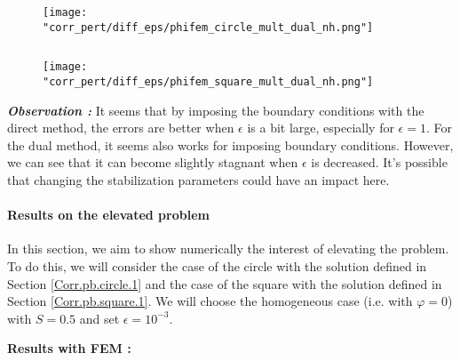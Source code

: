 \begin{enumerate}[label=\textbullet]
	\begin{minipage}{0.48\linewidth}
		\begin{figure}[H]
			\centering
			\texttt{[image: "corr\_pert/diff\_eps/phifem\_circle\_mult\_dual\_nh.png"]}
			\label{corr_pert_phifem_circle_mult_dual_nh}
		\end{figure} 
	\end{minipage} $\qquad$
	\begin{minipage}{0.48\linewidth}
		\begin{figure}[H]
			\centering
			\texttt{[image: "corr\_pert/diff\_eps/phifem\_square\_mult\_dual\_nh.png"]}
			\label{corr_pert_phifem_square_mult_dual_nh}
		\end{figure} 
	\end{minipage}
	
	\textbf{\textit{Observation :}} It seems that by imposing the boundary conditions with the direct method, the errors are better when $\epsilon$ is a bit large, especially for $\epsilon=1$. For the dual method, it seems also works for imposing boundary conditions. However, we can see that it can become slightly stagnant when $\epsilon$ is decreased. It's possible that changing the stabilization parameters could have an impact here.
	
\end{enumerate}

\paragraph{Results on the elevated problem} \label{Corr.results.disturbed.reh} 

In this section, we aim to show numerically the interest of elevating the problem. To do this, we will consider the case of the circle with the solution defined in Section \ref{Corr.pb.circle.1} and the case of the square with the solution defined in Section \ref{Corr.pb.square.1}. We will choose the homogeneous case (i.e. with $\varphi=0$) with $S=0.5$ and set $\epsilon=10^{-3}$.

\textbf{Results with FEM :}

